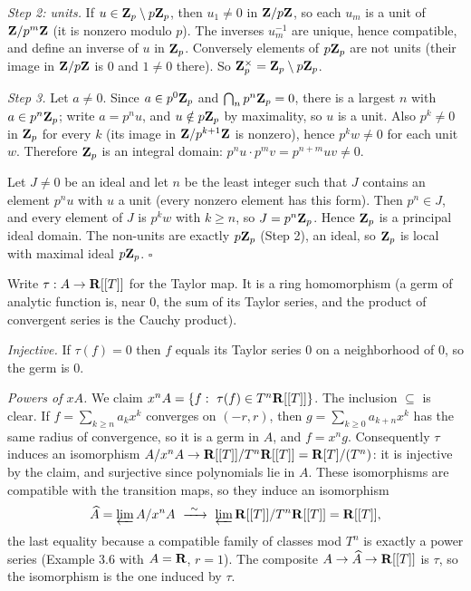 \documentclass[11pt]{article}
\begin{document}
\emph{Step 2: units.} If $u\in\mathbf Z_p\setminus p\mathbf Z_p$, then $u_1\ne0$ in $\mathbf Z/p\mathbf Z$, so each $u_m$ is a unit of $\mathbf Z/p^m\mathbf Z$ (it is nonzero modulo $p$). The inverses $u_m^{-1}$ are unique, hence compatible, and define an inverse of $u$ in $\mathbf Z_p$. Conversely elements of $p\mathbf Z_p$ are not units (their image in $\mathbf Z/p\mathbf Z$ is $0$ and $1\ne0$ there). So $\mathbf Z_p^\times=\mathbf Z_p\setminus p\mathbf Z_p$.

\emph{Step 3.} Let $a\ne0$. Since $a\in p^0\mathbf Z_p$ and $\bigcap_np^n\mathbf Z_p=0$, there is a largest $n$ with $a\in p^n\mathbf Z_p$; write $a=p^nu$, and $u\notin p\mathbf Z_p$ by maximality, so $u$ is a unit. Also $p^k\ne0$ in $\mathbf Z_p$ for every $k$ (its image in $\mathbf Z/p^{k+1}\mathbf Z$ is nonzero), hence $p^kw\ne0$ for each unit $w$. Therefore $\mathbf Z_p$ is an integral domain: $p^nu\cdot p^mv=p^{n+m}uv\ne0$.

Let $J\ne0$ be an ideal and let $n$ be the least integer such that $J$ contains an element $p^nu$ with $u$ a unit (every nonzero element has this form). Then $p^n\in J$, and every element of $J$ is $p^{k}w$ with $k\ge n$, so $J=p^n\mathbf Z_p$. Hence $\mathbf Z_p$ is a principal ideal domain. The non-units are exactly $p\mathbf Z_p$ (Step 2), an ideal, so $\mathbf Z_p$ is local with maximal ideal $p\mathbf Z_p$. \hfill$\square$

\pf
Write $\tau:A\to\mathbf R[[T]]$ for the Taylor map. It is a ring homomorphism (a germ of analytic function is, near $0$, the sum of its Taylor series, and the product of convergent series is the Cauchy product).

\emph{Injective.} If $\tau(f)=0$ then $f$ equals its Taylor series $0$ on a neighborhood of $0$, so the germ is $0$.

\emph{Powers of $xA$.} We claim $x^nA=\{f:\ \tau(f)\in T^n\mathbf R[[T]]\}$. The inclusion $\subseteq$ is clear. If $f=\sum_{k\ge n}a_kx^k$ converges on $(-r,r)$, then $g=\sum_{k\ge0}a_{k+n}x^k$ has the same radius of convergence, so it is a germ in $A$, and $f=x^ng$. Consequently $\tau$ induces an isomorphism $A/x^nA\to\mathbf R[[T]]/T^n\mathbf R[[T]]=\mathbf R[T]/(T^n)$: it is injective by the claim, and surjective since polynomials lie in $A$. These isomorphisms are compatible with the transition maps, so they induce an isomorphism
\[ \widehat{A}=\varprojlim A/x^nA\ \xrightarrow{\ \sim\ }\ \varprojlim\R[[T]]/T^n\R[[T]]=\R[[T]], \]
the last equality because a compatible family of classes mod $T^n$ is exactly a power series (Example 3.6 with $A=\mathbf R$, $r=1$). The composite $A\to\widehat{A}\to\mathbf R[[T]]$ is $\tau$, so the isomorphism is the one induced by $\tau$.
\end{document}
